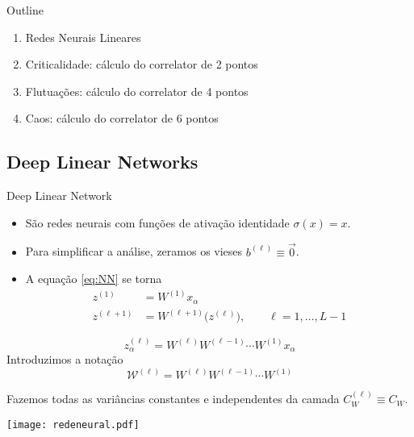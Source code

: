 \documentclass{beamer}
\newcommand{\WW}{\mathcal{W}}
\begin{document}
\begin{frame}
	\tableofcontents[currentsection]
\end{frame}

\begin{frame}{Outline}
	\begin{enumerate}[\S 3.1]
		\item Redes Neurais Lineares
		\item Criticalidade: cálculo do correlator de 2 pontos
		\item Flutuações: cálculo do correlator de 4 pontos
		\item Caos: cálculo do correlator de 6 pontos
	\end{enumerate}
	
\end{frame}

\subsection{Deep Linear Networks}
\begin{frame}{Deep Linear Network}
	\begin{itemize}
		\item São redes neurais com funções de ativação identidade $\sigma(x) = x$.
		\item Para simplificar a análise, zeramos os vieses $b^{(\ell)} \equiv \vec{0}$.
		\item A equação \eqref{eq:NN} se torna
		\begin{align*}
			z^{(1)} &= W^{(1)} x_\alpha \\ 	
			z^{(\ell+1)} &= W^{(\ell+1)}\big(z^{(\ell)}\big), \qquad \ell = 1, \ldots, L-1 
		\end{align*}
	\end{itemize}
\end{frame}
\begin{frame}
	\begin{equation*}\tag{3.2}
		z^{(\ell)}_\alpha = W^{(\ell)}W^{(\ell-1)}\cdots W^{(1)} x_\alpha
	\end{equation*}
Introduzimos a notação 
	\begin{equation*}\tag{3.3}
		\WW^{(\ell)} = W^{(\ell)}W^{(\ell-1)}\cdots W^{(1)}
	\end{equation*}

Fazemos todas as variâncias constantes e independentes da camada $C_W^{(\ell)} \equiv C_W$. 
\end{frame}


\begin{frame}
	\texttt{[image: redeneural.pdf]}
\end{frame}
\end{document}
